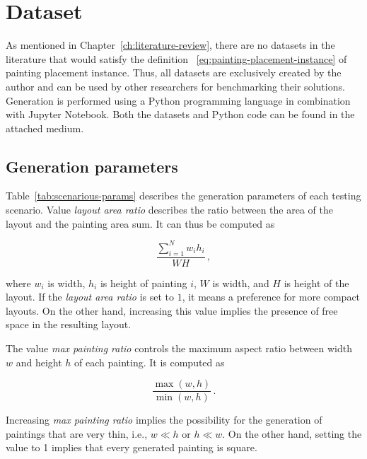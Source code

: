 \section{Dataset}\label{sec:dataset}

As mentioned in Chapter~\ref{ch:literature-review}, there are no datasets in the
literature that would satisfy the definition ~\ref{eq:painting-placement-instance} of painting placement instance.
Thus, all datasets are exclusively created by the author and can be used by other researchers
for benchmarking their solutions.
Generation is performed using a Python programming language in combination with Jupyter Notebook.
Both the datasets and Python code can be found in the attached medium.

\subsection{Generation parameters}\label{subsec:generation-parameters}

Table~\ref{tab:scenarious-params} describes the generation parameters of each testing scenario.
Value \textit{layout area ratio}
describes the ratio between the area of the layout and the painting area sum.
It can thus be computed as

\[
    \dfrac{\sum\limits_{i=1}^{N} w_i h_i}{WH}\,,
\]

where $w_i$ is width, $h_i$ is height of painting $i$, $W$ is width, and $H$ is height of the layout.
If the \textit{layout area ratio} is set to $1$, it means a preference for more compact layouts. On the other hand,
increasing this value implies the presence of free space in the resulting layout.

The value \textit{max painting ratio} controls the maximum aspect ratio between width $w$ and height $h$ of each painting.
It is computed as

\[
    \dfrac{\max(w,h)}{\min(w,h)}\,.
\]

Increasing \textit{max painting ratio} implies the possibility for the generation of paintings
that are very thin, i.e., $w \ll h$ or $h \ll w$. On the other hand, setting the value to 1
implies that every generated painting is square.

